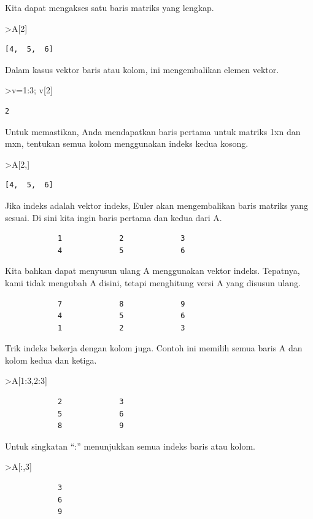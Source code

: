 \documentclass[
]{book}
\begin{document}
Kita dapat mengakses satu baris matriks yang lengkap.

\textgreater A{[}2{]}

\begin{verbatim}
[4,  5,  6]
\end{verbatim}

Dalam kasus vektor baris atau kolom, ini mengembalikan elemen vektor.

\textgreater v=1:3; v{[}2{]}

\begin{verbatim}
2
\end{verbatim}

Untuk memastikan, Anda mendapatkan baris pertama untuk matriks 1xn dan mxn, tentukan semua kolom menggunakan indeks kedua kosong.

\textgreater A{[}2,{]}

\begin{verbatim}
[4,  5,  6]
\end{verbatim}

Jika indeks adalah vektor indeks, Euler akan mengembalikan baris matriks yang sesuai. Di sini kita ingin baris pertama dan kedua dari A.

\begin{verbatim}
            1             2             3 
            4             5             6 
\end{verbatim}

Kita bahkan dapat menyusun ulang A menggunakan vektor indeks. Tepatnya, kami tidak mengubah A disini, tetapi menghitung versi A yang disusun ulang.

\begin{verbatim}
            7             8             9 
            4             5             6 
            1             2             3 
\end{verbatim}

Trik indeks bekerja dengan kolom juga. Contoh ini memilih semua baris A dan kolom kedua dan ketiga.

\textgreater A{[}1:3,2:3{]}

\begin{verbatim}
            2             3 
            5             6 
            8             9 
\end{verbatim}

Untuk singkatan ``:'' menunjukkan semua indeks baris atau kolom.

\textgreater A{[}:,3{]}

\begin{verbatim}
            3 
            6 
            9 
\end{verbatim}
\end{document}
